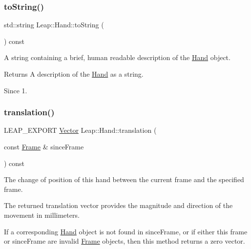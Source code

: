 \subsubsection{\texorpdfstring{to\+String()}{toString()}}
{\footnotesize\ttfamily std\+::string Leap\+::\+Hand\+::to\+String (\begin{DoxyParamCaption}{ }\end{DoxyParamCaption}) const\hspace{0.3cm}{\ttfamily [inline]}}

A string containing a brief, human readable description of the \hyperlink{class_leap_1_1_hand}{Hand} object.

\begin{DoxyReturn}{Returns}
A description of the \hyperlink{class_leap_1_1_hand}{Hand} as a string. 
\end{DoxyReturn}
\begin{DoxySince}{Since}
1. 
\end{DoxySince}
\mbox{\label{class_leap_1_1_hand_ad0ba1e3c607cb893619b668cc7750b89}} 
\subsubsection{\texorpdfstring{translation()}{translation()}}
{\footnotesize\ttfamily L\+E\+A\+P\+\_\+\+E\+X\+P\+O\+RT \hyperlink{struct_leap_1_1_vector}{Vector} Leap\+::\+Hand\+::translation (\begin{DoxyParamCaption}\item[{const \hyperlink{class_leap_1_1_frame}{Frame} \&}]{since\+Frame }\end{DoxyParamCaption}) const}

The change of position of this hand between the current frame and the specified frame.

The returned translation vector provides the magnitude and direction of the movement in millimeters.


\begin{DoxyCodeInclude}
\end{DoxyCodeInclude}


If a corresponding \hyperlink{class_leap_1_1_hand}{Hand} object is not found in since\+Frame, or if either this frame or since\+Frame are invalid \hyperlink{class_leap_1_1_frame}{Frame} objects, then this method returns a zero vector.


